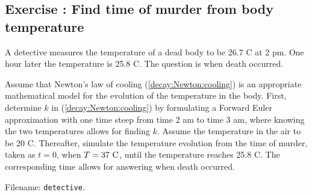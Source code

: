 \documentclass[%
oneside,                 %
final,                   %
10pt]{article}
\newenvironment{doconceexercise}{}{}
\newcounter{doconceexercisecounter}
\begin{document}
\begin{doconceexercise}

\subsection*{Exercise \thedoconceexercisecounter: Find time of murder from body temperature}

\label{decay:app:exer:cooling:murder}


A detective measures the temperature of a dead body to be 26.7 C at 2
pm. One hour later the temperature is 25.8 C. The question is when
death occurred.

Assume that Newton's law of cooling (\ref{decay:Newton:cooling}) is an
appropriate mathematical model for the evolution of the temperature in
the body.  First, determine $k$ in (\ref{decay:Newton:cooling}) by
formulating a Forward Euler approximation with one time steep from
time 2 am to time 3 am, where knowing the two temperatures allows for
finding $k$. Assume the temperature in the air to be 20 C. Thereafter,
simulate the temperature evolution from the time of murder, taken as
$t=0$, when $T=37\hbox{ C}$, until the temperature reaches 25.8 C. The
corresponding time allows for answering when death occurred.


\noindent Filename: \texttt{detective}.

\end{doconceexercise}
\end{document}
